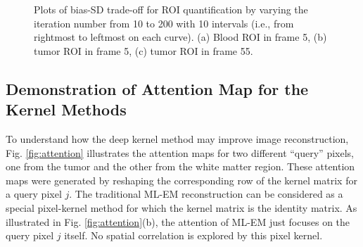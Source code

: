 \documentclass[]{IEEETran}
\begin{document}
	\begin{figure}[t]
		\vspace{-30pt}
		\centering
		\hfil
		\hfil
		\caption{Plots of bias-SD trade-off for ROI quantification by varying the iteration number from 10 to 200 with 10 intervals (i.e., from rightmost to leftmost on each curve). (a) Blood ROI in frame 5, (b) tumor ROI in frame 5, (c) tumor ROI in frame 55.}
		\label{ROI}
	\end{figure}
	
	\subsection{Demonstration of Attention Map for the Kernel Methods}
	
	To understand how the deep kernel method may improve image reconstruction, Fig. \ref{fig:attention} illustrates the attention maps for two different ``query'' pixels, one from the tumor and the other from the white matter region. These attention maps were generated by reshaping the corresponding row of the kernel matrix for a query pixel $j$. 
	The traditional ML-EM reconstruction can be considered as a special pixel-kernel method for which the kernel matrix is the identity matrix. As illustrated in Fig. \ref{fig:attention}(b), the attention of ML-EM just focuses on the query pixel $j$ itself. No spatial correlation is explored by this pixel kernel.
	
\end{document}
